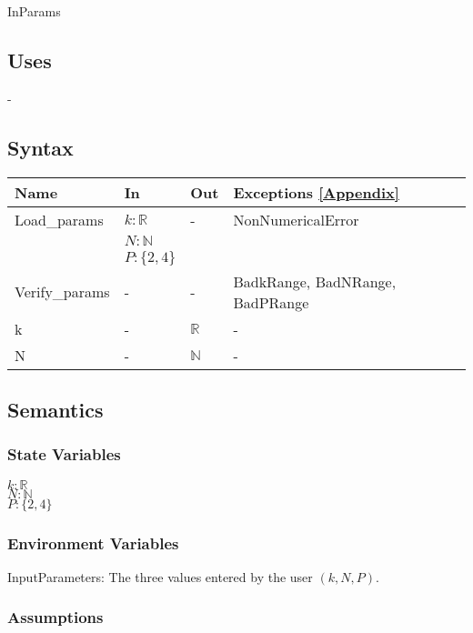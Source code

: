 \documentclass[12pt, titlepage]{article}
\begin{document}
InParams

\subsection{Uses}

-

\subsection{Syntax}

\begin{center}
\begin{tabular}{p{3cm} p{3cm} p{3cm} >{\raggedright\arraybackslash}p{7cm}}
\toprule
\textbf{Name} & \textbf{In} & \textbf{Out} & \textbf{Exceptions} \ref{Appendix} 
\\
\hline
Load\_params & $k : \mathbb{R}$ & - & NonNumericalError \\
& $N : \mathbb{N}$ &  &  \\ 
& $P : \{2,4\}$ &  &  \\
Verify\_params & - & - & BadkRange, BadNRange, BadPRange \\
k & - & $\mathbb{R}$ & - \\
N & - & $\mathbb{N}$ & - \\
\hline
\end{tabular}
\end{center}

\subsection{Semantics}

\subsubsection{State Variables}

$k : \mathbb{R}$ \\ 
$N : \mathbb{N}$ \\
$P : \{2,4\}$
\subsubsection{Environment Variables}

InputParameters: The three values entered by the user $(k,N,P)$. 

\subsubsection{Assumptions}
\end{document}
